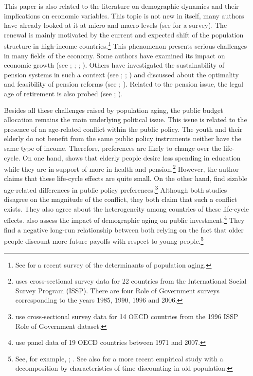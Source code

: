 This paper is also related to the literature on demographic dynamics and their implications on economic variables. This topic is not new in itself, many authors have already looked at it at micro and macro-levels (see \citealt{Clark1978} for a survey). The renewal is mainly motivated by the current and expected shift of the population structure in high-income countries.\footnote{See \cite{Bloom2016} for a recent survey of the determinants of population aging.} This phenomenon presents serious challenges in many fields of the economy. Some authors have examined its impact on economic growth (see \citealt{VanGroezen2005}; \citealt{Soares2005}; \citealt{Bloom2010}; \citealt{Lee2010}). Others have investigated the sustainability of pension systems in such a context (see \citealt{Ono2003}; \citealt{DelaCroix2013}; \citealt{Philipov2014}) and discussed about the optimality and feasibility of pension reforms (see \citealt{Pecchenino1997}; \citealt{Sinn2003}). Related to the pension issue, the legal age of retirement is also probed (see \citealt{Futagami2001}; \citealt{Dedry2017}).

Besides all these challenges raised by population aging, the public budget allocation remains the main underlying political issue. This issue is related to the presence of an age-related conflict within the public policy. The youth and their elderly do not benefit from the same public policy instruments neither have the same type of income. Therefore, preferences are likely to change over the life-cycle. On one hand, \cite{Sorensen2013} shows that elderly people desire less spending in education while they are in support of more in health and pension.\footnote{\cite{Sorensen2013} uses cross-sectional survey data for 22 countries from the International Social Survey Program (ISSP). There are four Role of Government surveys corresponding to the years 1985, 1990, 1996 and 2006.} However, the author claims that these life-cycle effects are quite small. On the other hand, \cite{Busemeyer2009} find sizable age-related differences in public policy preferences.\footnote{\cite{Busemeyer2009} use cross-sectional survey data for 14 OECD countries from the 1996 ISSP Role of Government dataset.} Although both studies disagree on the magnitude of the conflict, they both claim that such a conflict exists. They also agree about the heterogeneity among countries of these life-cycle effects. \cite{Jager2016} also assess the impact of demographic aging on public investment.\footnote{\cite{Jager2016} use panel data of 19 OECD countries between 1971 and 2007.} They find a negative long-run relationship between both relying on the fact that older people discount more future payoffs with respect to young people.\footnote{See, for example, \cite{Harrison2002}; \cite{Read2004}. See also \cite{Huffman2017} for a more recent empirical study with a decomposition by characteristics of time discounting in old population.}

